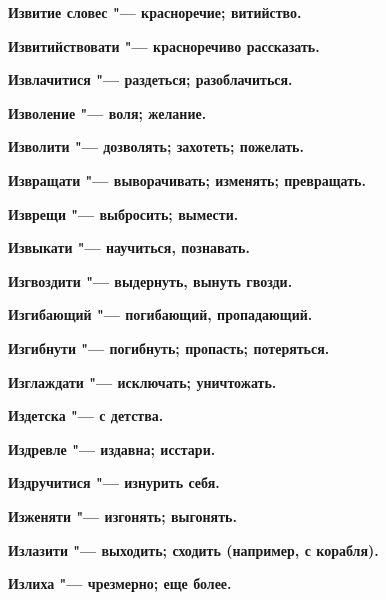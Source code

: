 \bfseries Извитие словес \normalfont{} "--- красноречие; витийство. 




\bfseries Извитийствовати \normalfont{} "--- красноречиво рассказать. 




\bfseries Извлачитися \normalfont{} "--- раздеться; разоблачиться. 




\bfseries Изволение \normalfont{} "--- воля; желание. 




\bfseries Изволити \normalfont{} "--- дозволять; захотеть; пожелать. 




\bfseries Извращати \normalfont{} "--- выворачивать; изменять; превращать. 




\bfseries Изврещи \normalfont{} "--- выбросить; вымести. 




\bfseries Извыкати \normalfont{} "--- научиться, познавать. 




\bfseries Изгвоздити \normalfont{} "--- выдернуть, вынуть гвозди. 




\bfseries Изгибающий \normalfont{} "--- погибающий, пропадающий. 




\bfseries Изгибнути \normalfont{} "--- погибнуть; пропасть; потеряться. 




\bfseries Изглаждати \normalfont{} "--- исключать; уничтожать. 




\bfseries Издетска \normalfont{} "--- с детства. 




\bfseries Издревле \normalfont{} "--- издавна; исстари. 




\bfseries Издручитися \normalfont{} "--- изнурить себя. 




\bfseries Изженяти \normalfont{} "--- изгонять; выгонять. 




\bfseries Излазити \normalfont{} "--- выходить; сходить (например, с корабля). 




\bfseries Излиха \normalfont{} "--- чрезмерно; еще более. 




